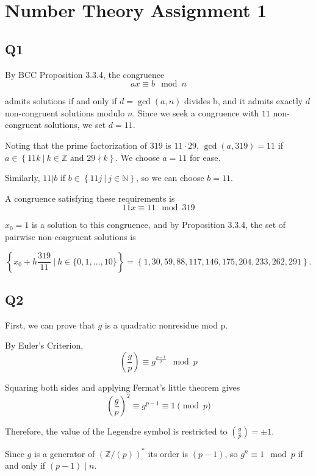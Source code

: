 \documentclass{amsart}
\begin{document}
    \section*{Number Theory Assignment 1}
    \hrulefill
    \subsection*{Q1} 
    By BCC Proposition 3.3.4, the congruence
    \[ax \equiv b \mod n\]

    admits solutions if and only if $d = \gcd(a, n)$ divides b, and it admits exactly $d$ non-congruent solutions modulo $n$. Since we seek a congruence with $11$ non-congruent solutions, we set $d = 11$.

    Noting that the prime factorization of $319$ is $11 \cdot 29$, $\gcd(a, 319) = 11$ if $a \in \left\{11k \ \vert \ k \in \mathbb{Z} \text{ and } 29 \nmid k\right\}$. We choose $a = 11$ for ease. 
    
    Similarly, $11 | b$ if $b \in \left\{11j \ \vert \ j \in \mathbb{N}\right\}$, so we can choose $b = 11$.

    A congruence satisfying these requirements is 
    \[11x \equiv 11 \mod 319\]

    $x_0 = 1$ is a solution to this congruence, and by Proposition 3.3.4, the set of pairwise non-congruent solutions is

    \[\left\{ x_0 + h \frac{319}{11} \ \vert \ h \in \{0, 1, \dots, 10\}\right\} = \left\{1, 30, 59, 88, 117, 146, 175, 204, 233, 262, 291\right\}.\]
    
    \hrulefill

    \subsection*{Q2}

    First, we can prove that $g$ is a quadratic nonresidue mod p.

    By Euler's Criterion,
    \[\left(\frac{g}{p}\right) \equiv g^{\frac{p-1}{2}} \mod p\]

    Squaring both sides and applying Fermat's little theorem gives
    \[\left(\frac{g}{p}\right)^2 \equiv g^{p-1} \equiv 1 \pmod p\]
    
    Therefore, the value of the Legendre symbol is restricted to $\left(\frac{g}{p}\right) = \pm 1$.

    Since $g$ is a generator of $(\mathbb{Z}/(p))^*$ its order is $(p-1)$, so $g^n \equiv 1 \mod p$ if and only if $(p-1) \mid n$.
    
\end{document}
